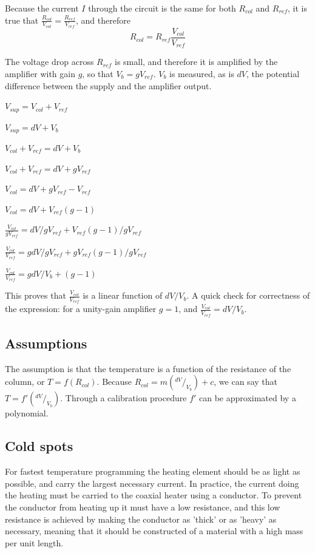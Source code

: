 Because the current $I$ through the circuit is the same for both $R_{col}$ and
$R_{ref}$, it is true that $\frac{R_{col}}{V_{col}}=\frac{R_{ref}}{V_{ref}}$,
and therefore \begin{equation}R_{col} = R_{ref}\frac{V_{col}}{V_{ref}}
\end{equation}

The voltage drop across $R_{ref}$ is small, and therefore it is amplified by the
amplifier with gain $g$, so that $V_b = gV_{ref}$. $V_b$ is measured, as is
$dV$, the potential difference between the supply and the amplifier output.

$V_{sup} = V_{col} + V_{ref}$ 

$V_{sup}=dV + V_b$

$V_{col} + V_{ref} = dV + V_b$

$V_{col} + V_{ref} = dV + gV_{ref}$

$V_{col} = dV + gV_{ref} - V_{ref} $

$V_{col} = dV + V_{ref}(g - 1)$

$\frac{\displaystyle V_{col}}{\displaystyle gV_{ref}} = dV/gV_{ref} + V_{ref}(g-1)/gV_{ref}$

$\frac{\displaystyle V_{col}}{\displaystyle V_{ref}} = gdV/gV_{ref} + gV_{ref}(g-1)/gV_{ref}$

$\frac{\displaystyle V_{col}}{\displaystyle V_{ref}} = gdV/V_b + (g-1)$

This proves that $\frac{\displaystyle V_{col}}{\displaystyle V_{ref}}$ is a
linear function of $dV/V_b$. A quick check for correctness of the expression:
for a unity-gain amplifier $g = 1$, and $\frac{\displaystyle
V_{col}}{\displaystyle V_{ref}} = dV/V_b$.


\subsection{Assumptions}

The assumption is that the temperature is a function of the resistance of the
column, or $T = f(R_{col})$. Because $R_{col}=m(^{dV}/_{V_b}) + c$, we can say
that $T = f'(^{dV}/_{V_b})$. Through a calibration procedure $f'$ can be
approximated by a polynomial.

\subsection{Cold spots}

For fastest temperature programming the heating element should be as light as
possible, and carry the largest necessary current. In practice, the current
doing the heating must be carried to the coaxial heater using a conductor. To
prevent the conductor from heating up it must have a low resistance, and this
low resistance is achieved by making the conductor as 'thick' or as 'heavy' as
necessary, meaning that it should be constructed of a material with a high mass per unit
length.

